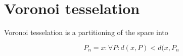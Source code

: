\documentclass[voronoi.tex]{subfiles}
\begin{document}
\chapter{Voronoi tesselation}

Voronoi tesselation is a partitioning of the space into 

\begin{equation}
    P_n = {x : \forall P: d(x, P) < d(x, P_n} 
\end{equation}
\end{document}
